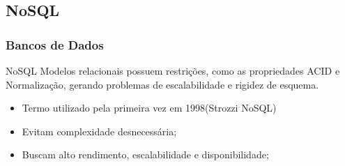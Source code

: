 \documentclass[brazil]{beamer}
\begin{document}

%
%
%
%


\subsection{NoSQL}

\begin{frame}
\frametitle{Bancos de Dados}
\begin{block}{NoSQL}
	Modelos relacionais possuem restrições, como as propriedades ACID e Normalização, gerando problemas de escalabilidade e rigidez de esquema.
	\begin{itemize}
		\item Termo utilizado pela primeira vez em 1998(Strozzi NoSQL)
		\item Evitam complexidade desnecessária;
		\item Buscam alto rendimento, escalabilidade e disponibilidade;
	\end{itemize}	
\end{block}
\end{frame}
\end{document}
